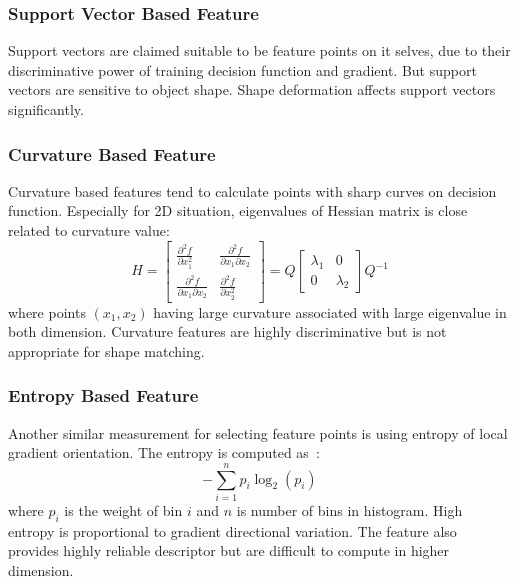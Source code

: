 \subsubsection{Support Vector Based Feature}
Support vectors are claimed suitable to be feature points on it selves, due to their discriminative power of training decision function and gradient. But support vectors are sensitive to object shape. Shape deformation affects support vectors significantly.

\subsubsection{Curvature Based Feature}
Curvature based features tend to calculate points with sharp curves on decision function. Especially for 2D situation, eigenvalues of Hessian matrix is close related to curvature value:
\begin{equation}
\label{eq:svshessian}
H=
\begin{bmatrix}
    \frac{\partial^2f}{\partial x^2_1} & \frac{\partial^2f}{\partial x_1\partial x_2}\\
    \frac{\partial^2f}{\partial x_1\partial x_2} & \frac{\partial^2f}{\partial x^2_2}
\end{bmatrix}
=Q
\begin{bmatrix}
    \lambda_1 & 0\\
    0 & \lambda_2
\end{bmatrix}
Q^{-1}
\end{equation}
where points $(x_1,x_2)$ having large curvature associated with large eigenvalue in both dimension. Curvature features are highly discriminative but is not appropriate for shape matching.

\subsubsection{Entropy Based Feature}
Another similar measurement for selecting feature points is using entropy of local gradient orientation. The entropy is computed as~\cite{Nguyen2013}:
\begin{equation}
\label{eq:svsentropy}
-\sum_{i=1}^np_i\log_2(p_i)
\end{equation}
where $p_i$ is the weight of bin $i$ and $n$ is number of bins in histogram. High entropy is proportional to gradient directional variation. The feature also provides highly reliable descriptor but are difficult to compute in higher dimension.